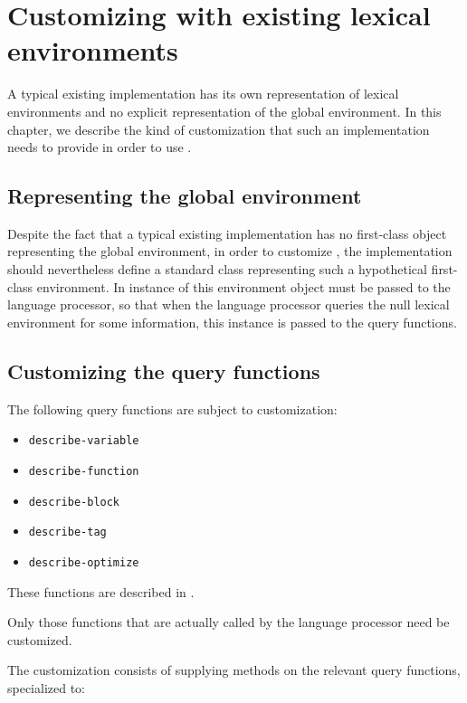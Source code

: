 \chapter{Customizing with existing lexical environments}

A typical existing \commonlisp{} implementation has its own
representation of lexical environments and no explicit representation
of the global environment.  In this chapter, we describe the kind of
customization that such an implementation needs to provide in order to
use \sysname{}.

\section{Representing the global environment}
\label{sec-representing-the-global-environment}

Despite the fact that a typical existing implementation has no
first-class object representing the global environment, in order to
customize \sysname{}, the implementation should nevertheless define a
standard class representing such a hypothetical first-class
environment.  In instance of this environment object must be passed to
the language processor, so that when the language processor queries
the null lexical environment for some information, this instance is
passed to the query functions.

\section{Customizing the query functions}

The following query functions are subject to customization:

\begin{itemize}
\item \texttt{describe-variable}
\item \texttt{describe-function}
\item \texttt{describe-block}
\item \texttt{describe-tag}
\item \texttt{describe-optimize}
\end{itemize}

These functions are described in .

Only those functions that are actually called by the language
processor need be customized.

The customization consists of supplying methods on the relevant query
functions, specialized to:

